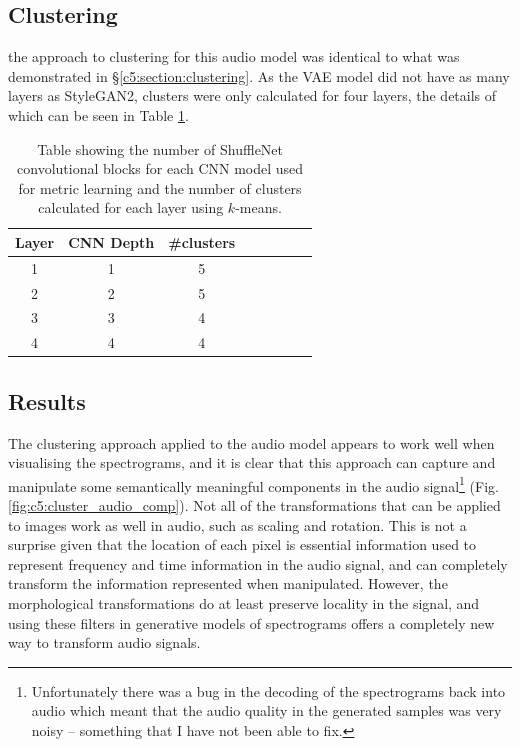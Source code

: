\subsection{Clustering}

the approach to clustering for this audio model was identical to what was demonstrated in \S \ref{c5:section:clustering}.
As the VAE model did not have as many layers as StyleGAN2, clusters were only calculated for four layers, the details of which can be seen in Table \ref{tab:c5:audio-clustering}.

\begin{table}[]
    \centering
    \begin{tabular}{|c|c|c|c|c|c|c|c|}
    \hline
    Layer & CNN Depth & \#clusters \\
    \hline
    1     & 1 &   5 \\
    2     & 2 &   5 \\
    3     & 3 &   4 \\
    4     & 4 &  4 \\
    \hline
    \end{tabular}
    \medskip
    \caption{\label{tab:c5:audio-clustering}Table showing the number of ShuffleNet \citep{zhang2018shufflenet} convolutional blocks for each CNN model used for metric learning and the number of clusters calculated for each layer using $k$-means.}
    
    \end{table}

\subsection{Results}

The clustering approach applied to the audio model appears to work well when visualising the spectrograms, and it is clear that this approach can capture and manipulate some semantically meaningful components in the audio signal\footnote{Unfortunately there was a bug in the decoding of the spectrograms back into audio which meant that the audio quality in the generated samples was very noisy -- something that I have not been able to fix.}  (Fig. \ref{fig:c5:cluster_audio_comp}). 
Not all of the transformations that can be applied to images work as well in audio, such as scaling and rotation.
This is not a surprise given that the location of each pixel is essential information used to represent frequency and time information in the audio signal, and can completely transform the information represented when manipulated.
However, the morphological transformations do at least preserve locality in the signal, and using these filters in generative models of spectrograms offers a completely new way to transform audio signals.

